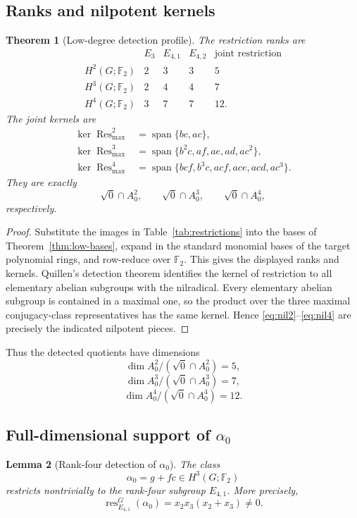\documentclass[11pt]{amsart}
\newtheorem{theorem}{Theorem}[section]
\newtheorem{lemma}[theorem]{Lemma}
\theoremstyle{definition}
\theoremstyle{remark}
\DeclareMathOperator{\Span}{span}
\DeclareMathOperator{\res}{res}
\newcommand{\F}{\mathbb F}
\newcommand{\Nrad}{\sqrt{0}}
\newcommand{\Res}{\operatorname{Res}}
\begin{document}
\subsection{Ranks and nilpotent kernels}

\begin{theorem}[Low-degree detection profile]
\label{thm:detection-profile}
The restriction ranks are
\[
\begin{array}{c|cccc}
& E_3&E_{4,1}&E_{4,2}&\text{joint restriction}\\
\hline
H^2(G;\F_2)&2&3&3&5\\
H^3(G;\F_2)&2&4&4&7\\
H^4(G;\F_2)&3&7&7&12.
\end{array}
\]
The joint kernels are
\begin{align}
\ker \Res^2_{\max}
   & =\Span\{bc,ac\},\label{eq:nil2}\\
\ker \Res^3_{\max}
   & =\Span\{b^2c,af,ae,ad,ac^2\},\label{eq:nil3}\\
\ker \Res^4_{\max}
   & =\Span\{bcf,b^3c,acf,ace,acd,ac^3\}.
   \label{eq:nil4}
\end{align}
They are exactly
\[
\Nrad\cap A_0^2,
\qquad
\Nrad\cap A_0^3,
\qquad
\Nrad\cap A_0^4,
\]
respectively.
\end{theorem}

\begin{proof}
Substitute the images in Table~\ref{tab:restrictions} into the bases of Theorem~\ref{thm:low-bases}, expand in the standard monomial bases of the target polynomial rings, and row-reduce over \(\F_2\).  This gives the displayed ranks and kernels.  Quillen's detection theorem identifies the kernel of restriction to all elementary abelian subgroups with the nilradical.  Every elementary abelian subgroup is contained in a maximal one, so the product over the three maximal conjugacy-class representatives has the same kernel.  Hence \eqref{eq:nil2}--\eqref{eq:nil4} are precisely the indicated nilpotent pieces.
\end{proof}

Thus the detected quotients have dimensions
\[
\dim A_0^2/(\Nrad\cap A_0^2)=5,
\]
\[
\dim A_0^3/(\Nrad\cap A_0^3)=7,
\]
\[
\dim A_0^4/(\Nrad\cap A_0^4)=12.
\]

\subsection{Full-dimensional support of \texorpdfstring{$\alpha_0$}{alpha0}}

\begin{lemma}[Rank-four detection of $\alpha_0$]
\label{lem:alpha-rank-four}
The class
\[
\alpha_0=g+fc\in H^3(G;\F_2)
\]
restricts nontrivially to the rank-four subgroup $E_{4,1}$.  More precisely,
\[
\res^G_{E_{4,1}}(\alpha_0)=x_2x_3(x_2+x_3)\neq0.
\]
\end{lemma}
\end{document}
